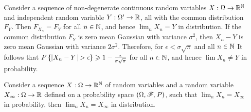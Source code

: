 \documentclass[letterpaper,10pt,english]{article}
\begin{document}
\begin{shaded}
\begin{exmp} 
Consider a sequence of non-degenerate continuous \iid random variables $X:\Omega\to\mathbb{R}^{\mathbb{N}}$ and independent random variable $Y: \Omega'\to\mathbb{R}$, all with the common distribution $F_Y$. 
Then $F_{X_n} = F_Y$ for all $n \in \mathbb{N}$, and hence $\lim_nX_n = Y$ in distribution. 
If the common distribution $F_Y$ is zero mean Gaussian with variance $\sigma^2$, 
then $X_n - Y$ is zero mean Gaussian with variance $2\sigma^2$. 
Therefore, for $\epsilon < \sigma\sqrt{\pi}$ and all $n \in \mathbb{N}$
It follows that $P\left\{\left\lvert X_n - Y\right\rvert > \epsilon\right\} \geqslant 1- \frac{\epsilon}{\sigma\sqrt{\pi}}$ for all $n \in \mathbb{N}$, and hence $\lim X_n \neq Y$ in probability.
\end{exmp}
\end{shaded}
\begin{lem} 
Consider a sequence $X:\Omega\to\mathbb{R}^{\mathbb{N}}$ of random variables and a random variable $X_\infty: \Omega\to\mathbb{R}$ defined on a probability space $(\Omega, \mathscr{F}, P)$, 
such that $\lim_nX_n = X_\infty$ in probability, then $\lim_nX_n = X_\infty$ in distribution.
\end{lem}
\end{document}
